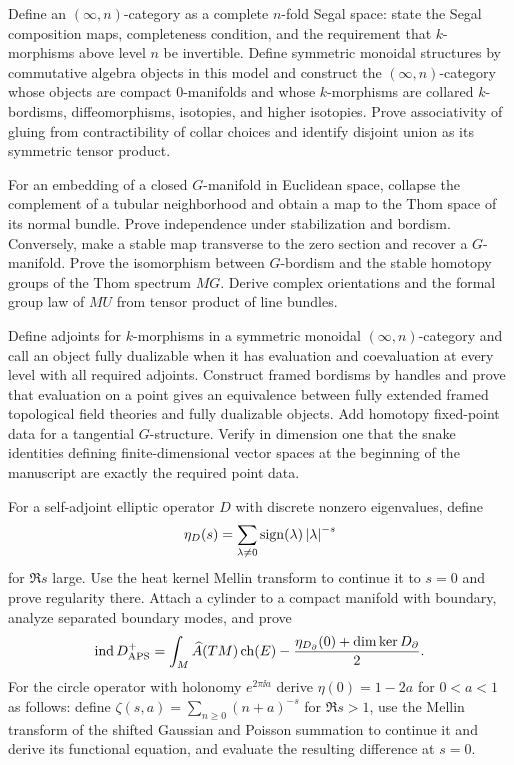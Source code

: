 \begin{exercise}
Define an $(\infty,n)$-category as a complete $n$-fold Segal space: state the
Segal composition maps, completeness condition, and the requirement that
$k$-morphisms above level $n$ be invertible.  Define symmetric monoidal
structures by commutative algebra objects in this model and construct the
$(\infty,n)$-category whose objects are compact $0$-manifolds and whose
$k$-morphisms are collared $k$-bordisms, diffeomorphisms, isotopies, and
higher isotopies.  Prove associativity of gluing from contractibility of
collar choices and identify disjoint union as its symmetric tensor product.
\end{exercise}

\begin{exercise}
For an embedding of a closed $G$-manifold in Euclidean space, collapse the
complement of a tubular neighborhood and obtain a map to the Thom space of
its normal bundle.  Prove independence under stabilization and bordism.
Conversely, make a stable map transverse to the zero section and recover a
$G$-manifold.  Prove the isomorphism between $G$-bordism and the stable
homotopy groups of the Thom spectrum $MG$.  Derive complex orientations and
the formal group law of $MU$ from tensor product of line bundles.
\end{exercise}

\begin{exercise}
Define adjoints for $k$-morphisms in a symmetric monoidal
$(\infty,n)$-category and
call an object fully dualizable when it has evaluation and coevaluation at
every level with all required adjoints.  Construct framed bordisms by handles
and prove that evaluation on a point gives an equivalence between fully
extended framed topological field theories and fully dualizable objects.
Add homotopy fixed-point data for a tangential $G$-structure.  Verify in
dimension one that the snake identities defining finite-dimensional vector
spaces at the beginning of the manuscript are exactly the required point
data.
\end{exercise}

\begin{exercise}
For a self-adjoint elliptic operator $D$ with discrete nonzero eigenvalues,
define
\[
 \eta_D(s)=\sum_{\lambda\ne0}\operatorname{sign}(\lambda)\left\lvert \lambda\right\rvert^{-s}
\]
for $\Re s$ large.  Use the heat kernel Mellin transform to continue it to
$s=0$ and prove regularity there.  Attach a cylinder to a compact manifold
with boundary, analyze separated boundary modes, and prove
\[
 \operatorname{ind}D^+_{\rm APS}
 =\int_M\widehat A(TM)\operatorname{ch}(E)
 -\frac{\eta_{D_\partial}(0)+\dim\ker D_\partial}{2}.
\]
For the circle operator with holonomy $e^{2\pi\ii a}$ derive
$\eta(0)=1-2a$ for $0<a<1$ as follows: define
$\zeta(s,a)=\sum_{n\geq0}(n+a)^{-s}$ for $\Re s>1$, use the Mellin transform
of the shifted Gaussian and Poisson summation to continue it and derive its
functional equation, and evaluate the resulting difference at $s=0$.
\end{exercise}

